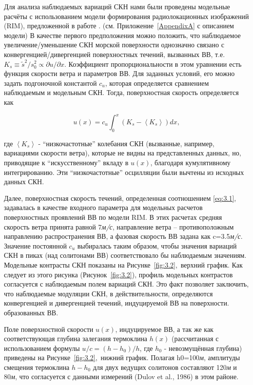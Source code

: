 Для анализа наблюдаемых вариаций СКН нами были проведены модельные расчёты с использованием модели формирования радиолокационных изображений (RIM), предложенной в работе \citep{Kudryavtsev2005}. (см. Приложение~\ref{AppendixA} с описанием модели) В качестве первого предположения можно положить, что наблюдаемое увеличение/уменьшение СКН морской поверхности однозначно связано с конвергенцией/дивергенцией поверхностных течений, вызванных ВВ, т.е. $K_{s} \equiv \tilde{s}^{2} /s_{0}^{2} \propto \partial u/\partial x$. Коэффициент пропорциональности в этом уравнении есть функция скорости ветра и параметров ВВ. Для заданных условий, его можно задать подгоночной константой $c_{u} $, которая определяется сравнением наблюдаемым и модельным СКН. Тогда, поверхностная скорость определяется как



\begin{equation} \label{eq:3.1} u(x)=c_{u} \int _{0}^{x}\left(K_{s} -\left\langle K_{s} \right\rangle \right)dx ,  \end{equation} 



\noindent где $\left\langle K_{s} \right\rangle $ - ``низкочастотные'' колебания СКН (вызванные, например, вариациями скорости ветра), которые не видны на представленных данных, но, приводящие к ``искусственному'' вкладу в $u(x)$, благодаря кумулятивному интегрированию. Эти ``низкочастотные'' осцилляции были вычтены из исходных данных СКН.

Далее, поверхностная скорость течений, определенная соотношением \eqref{eq:3.1}, задавалась в качестве входного параметра для модельных расчетов поверхностных проявлений ВВ по модели RIM. В этих расчетах средняя скорость ветра принята равной 7\textit{м/с}, направление ветра -- противоположным направлению распространения ВВ, а фазовая скорость ВВ задана как c=3.5\textit{м/с}. Значение постоянной $c_{u} $ выбиралась таким образом, чтобы значения вариаций СКН в пиках (над солитонами ВВ) соответствовало бы наблюдаемым значениям. Модельные контрасты СКН показаны на Рисунке~\ref{fig:3.2},~верхний график. Как следует из этого рисунка (Рисунок~\ref{fig:3.2}), профиль модельных контрастов согласуется с наблюдаемым полем вариаций СКН. Это факт позволяет заключить, что наблюдаемые модуляции СКН, в действительности, определяются конвергенцией и дивергенцией течений, индуцируемой ВВ на поверхности. образованных ВВ.

Поле поверхностной скорости $u(x)$, индуцируемое ВВ, а так же как соответствующая глубина залегания термоклина $h(x)$ (рассчитанная с использованием формулы $u/c=(h-h_{0} )/h$, где $h_{0} $ - невозмущённая глубина) приведены на Рисунке~\ref{fig:3.2},~нижний график. Полагая h0=100\textit{м}, амплитуды смещения термоклина $h-h_{0} $ для двух ведущих солитонов составляют 120\textit{м} и 80\textit{м}, что согласуется с данными измерений (Dulov et al., 1986) в этом районе.



